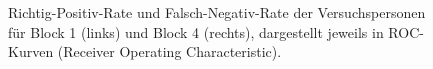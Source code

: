 \documentclass[doc,a4paper,12pt]{apa6}
\begin{document}
\begin{figure}[t]
  \centering
  \begin{minipage}{\textwidth}
    \hspace{0.02\textwidth}
    \vspace{10pt}
    \caption{Richtig-Positiv-Rate und Falsch-Negativ-Rate der Versuchspersonen für Block 1 (links) und Block 4 (rechts), dargestellt jeweils in ROC-Kurven (Receiver Operating Characteristic).}
    \label{roc}
  \end{minipage}
\end{figure}
\end{document}
